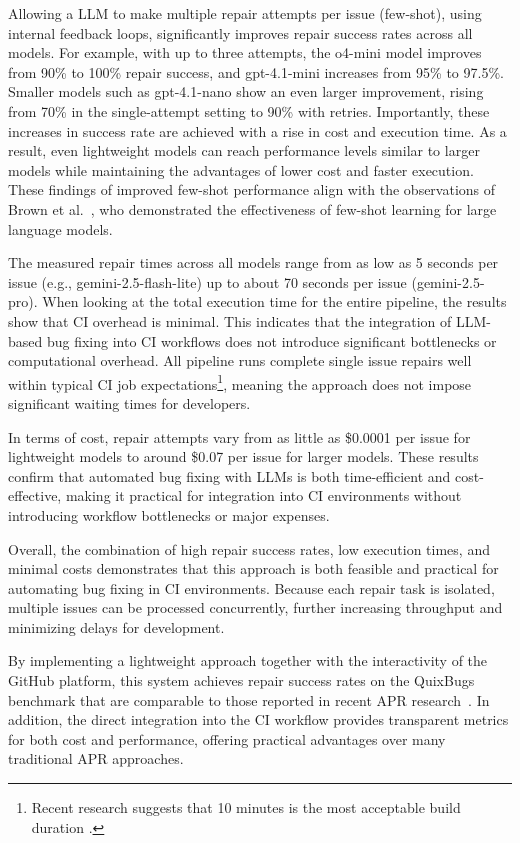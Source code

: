 Allowing a \ac{LLM} to make multiple repair attempts per issue (few-shot), using internal feedback loops, significantly improves repair success rates across all models. For example, with up to three attempts, the o4-mini model improves from 90\% to 100\% repair success, and gpt-4.1-mini increases from 95\% to 97.5\%. Smaller models such as gpt-4.1-nano show an even larger improvement, rising from 70\% in the single-attempt setting to 90\% with retries. Importantly, these increases in success rate are achieved with a rise in cost and execution time. As a result, even lightweight models can reach performance levels similar to larger models while maintaining the advantages of lower cost and faster execution. These findings of improved few-shot performance align with the observations of Brown et al.~\cite{brownLanguageModelsAre2020}, who demonstrated the effectiveness of few-shot learning for large language models.

The measured repair times across all models range from as low as 5 seconds per issue (e.g., gemini-2.5-flash-lite) up to about 70 seconds per issue (gemini-2.5-pro). When looking at the total execution time for the entire pipeline, the results show that \ac{CI} overhead is minimal. This indicates that the integration of LLM-based bug fixing into CI workflows does not introduce significant bottlenecks or computational overhead. All pipeline runs complete single issue repairs well within typical CI job expectations\footnote{Recent research suggests that 10 minutes is the most acceptable build duration \cite{hiltonTradeoffsContinuousIntegration2017}.}, meaning the approach does not impose significant waiting times for developers.

In terms of cost, repair attempts vary from as little as \$0.0001 per issue for lightweight models to around \$0.07 per issue for larger models. These results confirm that automated bug fixing with \acp{LLM} is both time-efficient and cost-effective, making it practical for integration into \ac{CI} environments without introducing workflow bottlenecks or major expenses.

Overall, the combination of high repair success rates, low execution times, and minimal costs demonstrates that this approach is both feasible and practical for automating bug fixing in CI environments. Because each repair task is isolated, multiple issues can be processed concurrently, further increasing throughput and minimizing delays for development.

By implementing a lightweight approach together with the interactivity of the GitHub platform, this system achieves repair success rates on the QuixBugs benchmark that are comparable to those reported in recent APR research~\cite{huCanGPTO1Kill2024, }. In addition, the direct integration into the CI workflow provides transparent metrics for both cost and performance, offering practical advantages over many traditional APR approaches.

